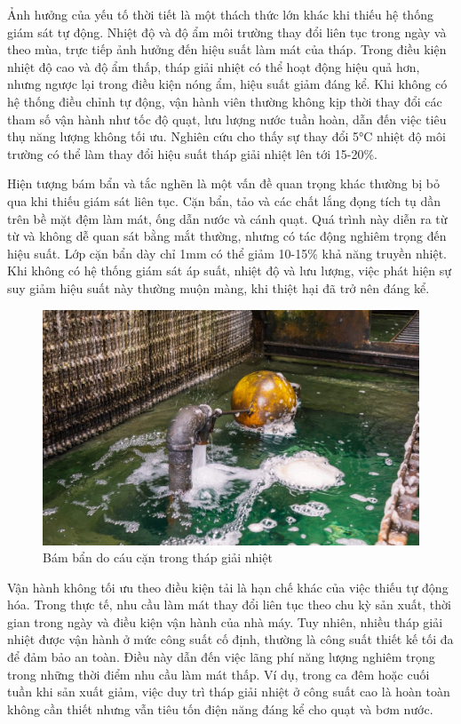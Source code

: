 \documentclass[../main.tex]{subfiles}
\begin{document}
Ảnh hưởng của yếu tố thời tiết là một thách thức lớn khác khi thiếu hệ thống giám sát tự động. Nhiệt độ và độ ẩm môi trường thay đổi liên tục trong ngày và theo mùa, trực tiếp ảnh hưởng đến hiệu suất làm mát của tháp. Trong điều kiện nhiệt độ cao và độ ẩm thấp, tháp giải nhiệt có thể hoạt động hiệu quả hơn, nhưng ngược lại trong điều kiện nóng ẩm, hiệu suất giảm đáng kể. Khi không có hệ thống điều chỉnh tự động, vận hành viên thường không kịp thời thay đổi các tham số vận hành như tốc độ quạt, lưu lượng nước tuần hoàn, dẫn đến việc tiêu thụ năng lượng không tối ưu. Nghiên cứu cho thấy sự thay đổi 5°C nhiệt độ môi trường có thể làm thay đổi hiệu suất tháp giải nhiệt lên tới 15-20\%.

Hiện tượng bám bẩn và tắc nghẽn là một vấn đề quan trọng khác thường bị bỏ qua khi thiếu giám sát liên tục. Cặn bẩn, tảo và các chất lắng đọng tích tụ dần trên bề mặt đệm làm mát, ống dẫn nước và cánh quạt. Quá trình này diễn ra từ từ và không dễ quan sát bằng mắt thường, nhưng có tác động nghiêm trọng đến hiệu suất. Lớp cặn bẩn dày chỉ 1mm có thể giảm 10-15\% khả năng truyền nhiệt. Khi không có hệ thống giám sát áp suất, nhiệt độ và lưu lượng, việc phát hiện sự suy giảm hiệu suất này thường muộn màng, khi thiệt hại đã trở nên đáng kể.

\begin{figure}
    \centering
    \includegraphics[width=1\textwidth]{Hinhve/dirty-cooling-tower-factory-authorized-service.jpg}
    \caption{Bám bẩn do cáu cặn trong tháp giải nhiệt}
    \label{fig:dirty-cooling-tower}
\end{figure}

Vận hành không tối ưu theo điều kiện tải là hạn chế khác của việc thiếu tự động hóa. Trong thực tế, nhu cầu làm mát thay đổi liên tục theo chu kỳ sản xuất, thời gian trong ngày và điều kiện vận hành của nhà máy. Tuy nhiên, nhiều tháp giải nhiệt được vận hành ở mức công suất cố định, thường là công suất thiết kế tối đa để đảm bảo an toàn. Điều này dẫn đến việc lãng phí năng lượng nghiêm trọng trong những thời điểm nhu cầu làm mát thấp. Ví dụ, trong ca đêm hoặc cuối tuần khi sản xuất giảm, việc duy trì tháp giải nhiệt ở công suất cao là hoàn toàn không cần thiết nhưng vẫn tiêu tốn điện năng đáng kể cho quạt và bơm nước.
\end{document}
